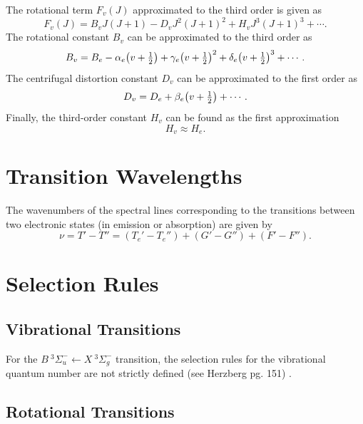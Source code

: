 \documentclass[11pt, twoside, fleqn]{report}
\DeclareRobustCommand\_{\ifmmode\expandafter\subtxt\else\textunderscore\fi}
\DeclarePairedDelimiter\p{\lparen}{\rparen}
\begin{document}
The rotational term $F_v(J)$ approximated to the third order is given as
\begin{equation}
    F_v(J) = B_vJ(J + 1) - D_vJ^2(J + 1)^2 + H_vJ^3(J + 1)^3 + \dotsb.
\end{equation}
The rotational constant $B_v$ can be approximated to the third order as
\begin{equation*}
    B_v = B_e - \alpha_e\p*{v + \tfrac{1}{2}} + \gamma_e\p*{v + \tfrac{1}{2}}^2 + \delta_e\p*{v + \tfrac{1}{2}}^3 + \dotsb.
\end{equation*}
The centrifugal distortion constant $D_v$ can be approximated to the first order as
\begin{equation}
    D_v = D_e + \beta_e\p*{v + \tfrac{1}{2}} + \dotsb.
\end{equation}
Finally, the third-order constant $H_v$ can be found as the first approximation
\begin{equation}
    H_v \approx H_e.
\end{equation}

\section{Transition Wavelengths}
\label{s:transition_wavelengths}

The wavenumbers of the spectral lines corresponding to the transitions between two electronic states (in emission or absorption) are given by
\begin{equation}
    \nu = T' - T'' = (T_e' - T_e'') + (G' - G'') + (F' - F'').
\end{equation}

\section{Selection Rules}
\label{s:selection_rules}

\subsection{Vibrational Transitions}
\label{ss:vibrational_transitions}

For the $B~^3\Sigma_u^-\!\leftarrow\!X~^3\Sigma_g^-$ transition, the selection rules for the vibrational quantum number are not strictly defined (see Herzberg pg. 151) \cite{herzberg:spectra}.

\subsection{Rotational Transitions}
\label{ss:rotational_transitions}
\end{document}
